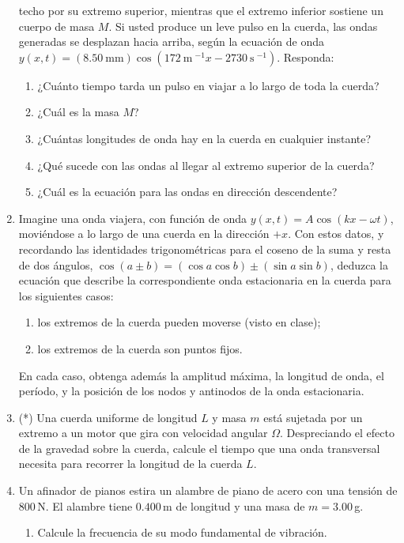 \documentclass[a4paper,12pt]{article}
\begin{document}
\begin{enumerate}
		techo por su extremo superior, mientras que el extremo inferior
		sostiene un cuerpo de masa $M$. Si usted produce un leve pulso en la
		cuerda, las ondas generadas se desplazan hacia arriba, según la
		ecuación de onda $y(x, t)= (8.50 \mathrm{\ mm}) \cos (172 \mathrm{\ m\
		}^{-1}x - 2730 \mathrm{\ s\ }^{-1} )$. Responda:
		\begin{enumerate}
			\item ¿Cuánto tiempo tarda un pulso en viajar a lo largo de toda la
				cuerda? 
			\item ¿Cuál es la masa $M$? 
			\item ¿Cuántas longitudes de onda hay en la cuerda en cualquier
				instante?
			\item ¿Qué sucede con las ondas al llegar al extremo superior de la
				cuerda?
			\item ¿Cuál es la ecuación para las ondas en dirección descendente?
		\end{enumerate}
	\item Imagine una onda viajera, con función de onda $y(x,t)=A \cos(kx -
		\omega t)$, moviéndose a lo largo de una cuerda en la dirección $+x$. Con
		estos datos, y recordando las identidades trigonométricas para el
		coseno de la suma y resta de dos ángulos, $\cos(a \pm b) = (\cos a \cos
		b) \pm (\sin a \sin b)$, deduzca la ecuación que describe la
		correspondiente onda estacionaria en la cuerda para los siguientes
		casos:
		\begin{enumerate}
			\item los extremos de la cuerda pueden moverse (visto en clase);
			\item los extremos de la cuerda son puntos fijos.
		\end{enumerate}
		En cada caso, obtenga además la amplitud máxima, la longitud de onda,
		el período, y la posición de los nodos y antinodos de la onda
		estacionaria.
	\item (*) Una cuerda uniforme de longitud $L$ y masa $m$ está sujetada por un
		extremo a un motor que gira con velocidad angular $\Omega$.
		Despreciando el efecto de la gravedad sobre la cuerda, calcule el
		tiempo que una onda transversal necesita para recorrer la longitud de
		la cuerda $L$.
	\item Un afinador de pianos estira un alambre de piano de acero con una
		tensión de $800$\,N. El alambre tiene $0.400$\,m de longitud y una masa
		de $m=3.00$\,g. 
		\begin{enumerate}
			\item Calcule la frecuencia de su modo fundamental de vibración.

\end{enumerate}
\end{enumerate}
\end{document}
